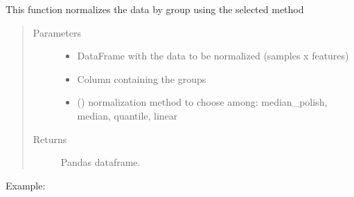 \documentclass[letterpaper,10pt,english]{sphinxmanual}
\begin{document}
\begin{fulllineitems}
\label{\detokenize{_autosummary/analytics_core.analytics:analytics_core.analytics.analytics.normalize_data_per_group}}
This function normalizes the data by group using the selected method
\begin{quote}\begin{description}
\item[{Parameters}] \leavevmode\begin{itemize}
\item {} 
 \textendash{} DataFrame with the data to be normalized (samples x features)

\item {} 
 \textendash{} Column containing the groups

\item {} 
 () \textendash{} normalization method to choose among: median\_polish, median,
quantile, linear

\end{itemize}

\item[{Returns}] \leavevmode
Pandas dataframe.

\end{description}\end{quote}

Example:

\begin{sphinxVerbatim}[commandchars=\\\{\}]
    
\end{sphinxVerbatim}

\end{fulllineitems}

\end{document}
